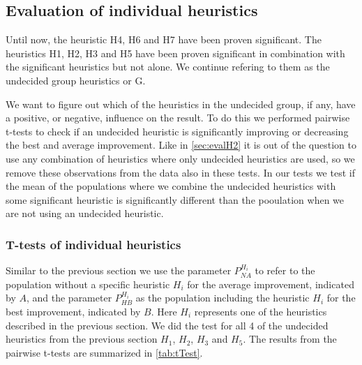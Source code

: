 \documentclass[../main.tex]{subfiles}
\begin{document}
\subsection{Evaluation of individual heuristics}
\label{sec:evalI}
Until now, the heuristic H4, H6 and H7 have been proven significant.
The heuristics H1, H2, H3 and H5 have been proven significant in combination with the significant heuristics but not alone.
We continue refering to them as the undecided group heuristics or G. 
\par
We want to figure out which of the heuristics in the undecided group, if any, have a positive, or negative, influence on the result.
To do this we performed pairwise t-tests to check if an undecided heuristic is significantly improving or decreasing the best and average improvement.
Like in \cref{sec:evalH2} it is out of the question to use any combination of heuristics where only undecided heuristics are used, so we remove these observations from the data also in these tests.
In our tests we test if the mean of the populations where we combine the undecided heuristics with some significant heuristic is significantly different than the pooulation when we are not using an undecided heuristic. 

\subsubsection{T-tests of individual heuristics}
Similar to the previous section we use the parameter $P^{H_i}_{NA}$ to refer to the population without a specific heuristic $H_i$ for the average improvement, indicated by $A$, and the parameter $P^{H_i}_{HB}$ as the population including the heuristic $H_i$ for the best improvement, indicated by $B$. 
Here $H_i$ represents one of the heuristics described in the previous section. 
We did the test for all 4 of the undecided heuristics from the previous section $H_1$, $H_2$, $H_3$ and $H_5$.
The results from the pairwise t-tests are summarized in \ref{tab:tTest}.
\end{document}

